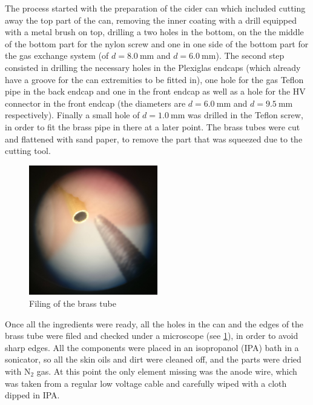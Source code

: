 The process started with the preparation of the cider can which included cutting
away the top part of the can, removing the inner coating with a drill equipped with a
metal brush on top, drilling a two holes in the bottom, on the the middle of the
bottom part for the nylon screw and one in one side of the bottom part for the
gas exchange system (of $d = \SI{8.0}{\milli\meter}$ and $d =
\SI{6.0}{\milli\meter}$). The second step consisted in drilling the necessary
holes in the Plexiglas endcaps (which already have a groove for the can
extremities to be fitted in), one hole for the gas Teflon pipe in the back
endcap and one in the front endcap as well as a hole for the HV connector in the
front endcap (the diameters are $d = \SI{6.0}{\milli\meter}$ and $d =
\SI{9.5}{\milli\meter}$ respectively). Finally a small hole of $d =
\SI{1.0}{\milli\meter}$ was drilled in the Teflon screw, in order to fit the
brass pipe in there at a later point. The brass tubes were cut and flattened
with sand paper, to remove the part that was squeezed due to the cutting tool.

\begin{figure}[h]
  \centering
  \includegraphics[width=0.5\textwidth]{./graphics/brass_file.jpg}
  \caption{Filing of the brass tube}
  \label{fig:brass_file}
\end{figure}


Once all the ingredients were ready, all the holes in the can and the edges of
the brass tube were filed and checked under a microscope (see \ref{fig:brass_file}), in order to avoid
sharp edges. All the components were placed in an isopropanol (IPA) bath in a
sonicator, so all the skin oils and dirt were cleaned off, and the parts were
dried with $\mathrm{N}_2$ gas. At this point the only element missing was the
anode wire, which was taken from a regular low voltage cable and carefully wiped
with a cloth dipped in IPA.


